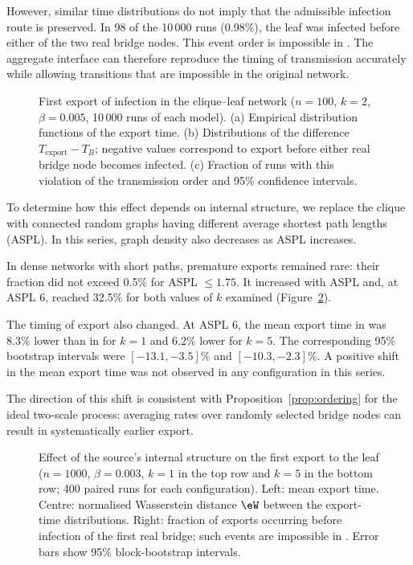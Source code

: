 However, similar time distributions do not imply that the admissible infection route is preserved. In 98 of the 10\,000 \TS{} runs (0.98\%), the leaf was infected before either of the two real bridge nodes. This event order is impossible in \Full{}. The aggregate interface can therefore reproduce the timing of transmission accurately while allowing transitions that are impossible in the original network.

\begin{figure}[tbp]
\centering
\caption{%
First export of infection in the clique--leaf network ($n=100$, $k=2$, $\beta=0.005$, 10\,000 runs of each model).
(a) Empirical distribution functions of the export time.
(b) Distributions of the difference $T_{\mathrm{export}}-T_B$; negative values correspond to export before either real bridge node becomes infected.
(c) Fraction of runs with this violation of the transmission order and 95\% confidence intervals.
}
\label{fig:clique_leaf}
\end{figure}

To determine how this effect depends on internal structure, we replace the clique with connected random graphs having different average shortest path lengths (ASPL). In this series, graph density also decreases as ASPL increases.

In dense networks with short paths, premature exports remained rare: their fraction did not exceed 0.5\% for ASPL $\leq 1.75$. It increased with ASPL and, at ASPL 6, reached 32.5\% for both values of $k$ examined (Figure~\ref{fig:source_sweep}).

The timing of export also changed. At ASPL 6, the mean export time in \TS{} was 8.3\% lower than in \Full{} for $k=1$ and 6.2\% lower for $k=5$. The corresponding 95\% bootstrap intervals were $[-13.1,-3.5]\%$ and $[-10.3,-2.3]\%$. A positive shift in the mean export time was not observed in any configuration in this series.

The direction of this shift is consistent with Proposition~\ref{prop:ordering} for the ideal two-scale process: averaging rates over randomly selected bridge nodes can result in systematically earlier export.

\begin{figure}[tbp]
\centering
\caption{%
Effect of the source's internal structure on the first export to the leaf ($n=1000$, $\beta=0.003$, $k=1$ in the top row and $k=5$ in the bottom row; 400 paired runs for each configuration).
Left: mean export time.
Centre: normalised Wasserstein distance $\eW$ between the export-time distributions.
Right: fraction of \TS{} exports occurring before infection of the first real bridge; such events are impossible in \Full{}.
Error bars show 95\% block-bootstrap intervals.
}
\label{fig:source_sweep}
\end{figure}

